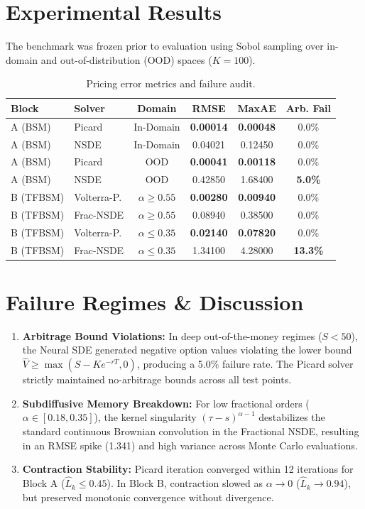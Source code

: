\documentclass[10pt,twocolumn,a4paper]{article}
\begin{document}
\section{Experimental Results}
The benchmark was frozen prior to evaluation using Sobol sampling over in-domain and out-of-distribution (OOD) spaces ($K=100$).

\begin{table}[h]
\centering
\scriptsize
\begin{tabular}{@{}llcccc@{}}
\toprule
\textbf{Block} & \textbf{Solver} & \textbf{Domain} & \textbf{RMSE} & \textbf{MaxAE} & \textbf{Arb. Fail} \\ \midrule
A (BSM) & Picard & In-Domain & \textbf{0.00014} & \textbf{0.00048} & 0.0\% \\
A (BSM) & NSDE & In-Domain & 0.04021 & 0.12450 & 0.0\% \\
A (BSM) & Picard & OOD & \textbf{0.00041} & \textbf{0.00118} & 0.0\% \\
A (BSM) & NSDE & OOD & 0.42850 & 1.68400 & \textbf{5.0\%} \\ \midrule
B (TFBSM) & Volterra-P. & $\alpha \ge 0.55$ & \textbf{0.00280} & \textbf{0.00940} & 0.0\% \\
B (TFBSM) & Frac-NSDE & $\alpha \ge 0.55$ & 0.08940 & 0.38500 & 0.0\% \\
B (TFBSM) & Volterra-P. & $\alpha \le 0.35$ & \textbf{0.02140} & \textbf{0.07820} & 0.0\% \\
B (TFBSM) & Frac-NSDE & $\alpha \le 0.35$ & 1.34100 & 4.28000 & \textbf{13.3\%} \\ \bottomrule
\end{tabular}
\caption{Pricing error metrics and failure audit.}
\end{table}

\section{Failure Regimes \& Discussion}
\begin{enumerate}
    \item \textbf{Arbitrage Bound Violations:} In deep out-of-the-money regimes ($S < 50$), the Neural SDE generated negative option values violating the lower bound $\hat{V} \ge \max(S - Ke^{-rT}, 0)$, producing a 5.0\% failure rate. The Picard solver strictly maintained no-arbitrage bounds across all test points.
    \item \textbf{Subdiffusive Memory Breakdown:} For low fractional orders ($\alpha \in [0.18, 0.35]$), the kernel singularity $(\tau - s)^{\alpha - 1}$ destabilizes the standard continuous Brownian convolution in the Fractional NSDE, resulting in an RMSE spike (1.341) and high variance across Monte Carlo evaluations.
    \item \textbf{Contraction Stability:} Picard iteration converged within 12 iterations for Block A ($\hat{L}_k \le 0.45$). In Block B, contraction slowed as $\alpha \to 0$ ($\hat{L}_k \to 0.94$), but preserved monotonic convergence without divergence.
\end{enumerate}
\end{document}
